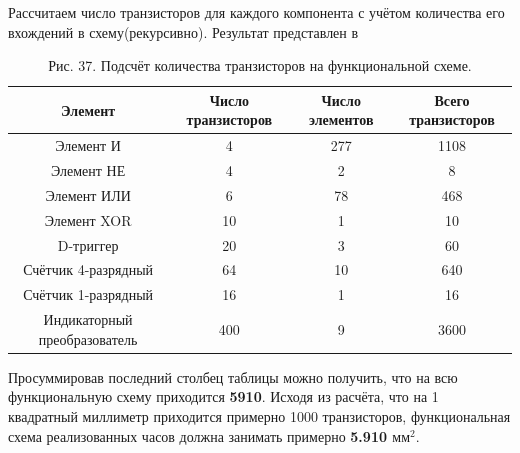 \documentclass[11pt,a4paper,final]{article} %
\begin{document}
Рассчитаем число транзисторов для каждого компонента с учётом количества его вхождений в схему(рекурсивно). Результат представлен в 

\begin{table}[H]
	\centering
	\caption*{Рис. 37. Подсчёт количества транзисторов на функциональной схеме.}
	\small{
		\begin{tabular}{|c|c|c|c|}
			\hline
			Элемент & Число транзисторов & Число элементов & Всего транзисторов  \\ 
			\hline
			Элемент И & 4 & 277 & 1108  \\ 
			\hline
			Элемент НЕ & 4 & 2 & 8  \\ 
			\hline
			Элемент ИЛИ & 6 & 78 & 468  \\ 
			\hline
			Элемент XOR & 10 & 1 & 10  \\ 
			\hline
			D-триггер & 20 & 3 & 60  \\ 
			\hline
			Счётчик 4-разрядный & 64 & 10 & 640 \\ 
			\hline
			Счётчик 1-разрядный & 16 & 1 & 16 \\ 
			\hline
			Индикаторный преобразователь & 400 & 9 & 3600 \\ 
			\hline
		\end{tabular}
	}
\end{table}

Просуммировав последний столбец таблицы можно получить, что на всю функциональную схему приходится \textbf{5910}. Исходя из расчёта, что на 1 квадратный миллиметр приходится примерно 1000 транзисторов, функциональная схема реализованных часов должна занимать примерно \textbf{5.910 ${\text{мм}}^2$}.


\newpage
\end{document}
